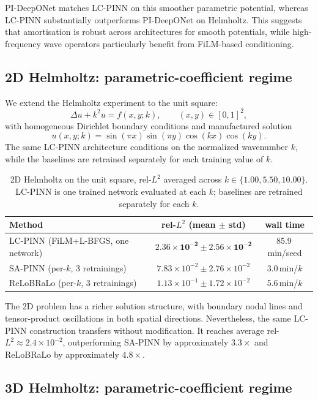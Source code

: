 \documentclass{article}
\theoremstyle{plain}
\theoremstyle{definition}
\theoremstyle{remark}
\begin{document}
PI-DeepONet matches LC-PINN on this smoother parametric potential,
whereas LC-PINN substantially outperforms PI-DeepONet on Helmholtz.
This suggests that amortisation is robust across architectures for
smooth potentials, while high-frequency wave operators particularly
benefit from FiLM-based conditioning.

\subsection{2D Helmholtz: parametric-coefficient regime}
\label{sec:results-helmholtz-2d}

We extend the Helmholtz experiment to the unit square:
\[
    \Delta u + k^2 u = f(x,y;k),
    \qquad (x,y) \in [0,1]^2,
\]
with homogeneous Dirichlet boundary conditions and manufactured
solution
\[
    u(x,y;k)
    =
    \sin(\pi x)\sin(\pi y)\cos(kx)\cos(ky).
\]
The same LC-PINN architecture conditions on the normalized wavenumber
$k$, while the baselines are retrained separately for each training
value of $k$.

\begin{table}[!t]
\centering
\caption{2D Helmholtz on the unit square, rel-$L^2$ averaged across
$k \in \{1.00,5.50,10.00\}$. LC-PINN is one trained network evaluated
at each $k$; baselines are retrained separately for each $k$.}
\label{tab:helmholtz-2d}
\small
\begin{tabular}{lcc}
\toprule
Method & rel-$L^2$ (mean $\pm$ std) & wall time \\
\midrule
LC-PINN (FiLM+L-BFGS, one network) & $\mathbf{2.36 \times 10^{-2} \pm 2.56 \times 10^{-2}}$ & 85.9\,min/seed \\
SA-PINN (per-$k$, 3 retrainings)   & $7.83 \times 10^{-2} \pm 2.76 \times 10^{-2}$ & 3.0\,min/$k$ \\
ReLoBRaLo (per-$k$, 3 retrainings) & $1.13 \times 10^{-1} \pm 1.72 \times 10^{-2}$ & 5.6\,min/$k$ \\
\bottomrule
\end{tabular}
\end{table}

The 2D problem has a richer solution structure, with boundary nodal
lines and tensor-product oscillations in both spatial directions.
Nevertheless, the same LC-PINN construction transfers without
modification. It reaches average rel-$L^2 \approx 2.4\times10^{-2}$,
outperforming SA-PINN by approximately $3.3\times$ and ReLoBRaLo by
approximately $4.8\times$.

\subsection{3D Helmholtz: parametric-coefficient regime}
\label{sec:results-helmholtz-3d}
\end{document}
